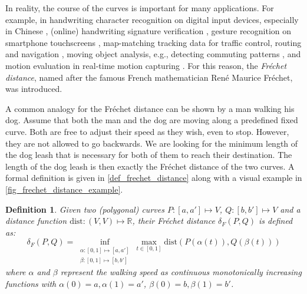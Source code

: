\documentclass[
oneside,
fontsize=11pt
]{scrartcl}
\newtheorem{mydef}{Definition}
\begin{document}
In reality, the course of the curves is important for many applications. 
For example, 
in handwriting character recognition on digital input devices, especially in Chinese \cite{chanin_david_hanzi_nodate},
(online) handwriting signature verification \cite{zheng_algorithm_2008,fang_research_2018},
gesture recognition on smartphone touchscreens \cite{hu_research_2022}, %
map-matching tracking data for traffic control, routing and navigation \cite{wenk_addressing_2006,brakatsoulas_map-matching_2005},
moving object analysis, e.g., detecting commuting patterns \cite{buchin_detecting_2011},
and motion evaluation in real-time motion capturing \cite{qiao_real-time_2017, shehu_curve_2012}. %
For this reason, the \textit{Fréchet distance}, named after the famous French mathematician René Maurice Fréchet, was introduced.

A common analogy for the Fréchet distance can be shown by a man walking his dog. 
Assume that both the man and the dog are moving along a predefined fixed curve. 
Both are free to adjust their speed as they wish, even to stop. 
However, they are not allowed to go backwards. 
We are looking for the minimum length of the dog leash 
that is necessary for both of them to reach their destination. 
The length of the dog leash is then exactly the Fréchet distance of the two curves.
A formal definition is given in \autoref{def_frechet_distance} 
along with a visual example in \autoref{fig_frechet_distance_example}.

\begin{mydef}
  \label{def_frechet_distance}
  Given two (polygonal) curves $P: [a,a'] \mapsto V$, $Q: [b,b'] \mapsto V$ and a distance function $\text{dist}: (V,V) \mapsto \mathbb{R}$, 
  their Fréchet distance $\delta_{F}(P,Q)$ is defined as: 
  $$\delta_{F}(P,Q) = \inf_{\substack{\alpha: [0,1] \mapsto [a, a'] \\ \beta: [0,1] \mapsto [b, b']}} \max_{t \in [0,1]} \text{dist}(P(\alpha(t)), Q(\beta(t)))$$
  where $\alpha$ and $\beta$ represent the walking speed as 
  continuous monotonically increasing functions with
  $\alpha(0) = a, \alpha(1) = a'$, 
  $\beta(0) =b, \beta(1) =b'$.
\end{mydef}
\end{document}

